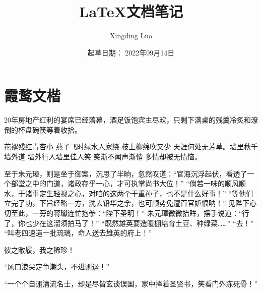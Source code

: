 \documentclass[12pt, letterpaper]{article}
\title{LaTeX文档笔记}
\author{Xingding Luo}
\date{起草日期： 2022年09月14日}
\newcommand{\xwwk}{\CJKfamily{xwwkt}}
\begin{document}
\begin{titlepage}
		\maketitle
\end{titlepage}
		\tableofcontents
		\section{霞鹜文楷}

\xwwk 20年房地产红利的宴席已经落幕，酒足饭饱宾主尽欢，只剩下满桌的残羹冷炙和潦倒的杯盘碗筷等着收拾。

		花褪残红青杏小 燕子飞时绿水人家绕 枝上柳绵吹又少 天涯何处无芳草。墙里秋千墙外道 墙外行人墙里佳人笑  笑渐不闻声渐悄 多情却被无情恼。

		至于朱元璋，则是坐于御案，沉思了半晌，忽然叹道：“官海沉浮起伏，看透了一个部堂之中的门道，诸政存乎一心，才可执掌尚书大位！”
		“倘若一味的顺风顺水，于诸事定生轻视之心，对咱的这两个干重孙子，也不是什么好事！”
		“等他们立完了功，下旨经略一方，洗去铅华之余，也可顺势免遭百官妒恨呐！”
		见陛下心切至此，一旁的蒋瓛连忙抱拳：“陛下圣明！”
		朱元璋微微抬眸，摆手说道：“行了，你也少在这溜须拍马了！”
		“既然雄英要造暖棚培育土豆、种绿菜……”
		“去！”
		“叫老四速造一批琉璃，命人送去雄英的府上！”

		彼之敝履，我之稀珍！

		“风口浪尖定争潮头，不进则退！”

		“一个个自诩清流名士，却是尽皆玄谈误国，家中捧着圣贤书，笑看门外冻死骨！”
\end{document}
